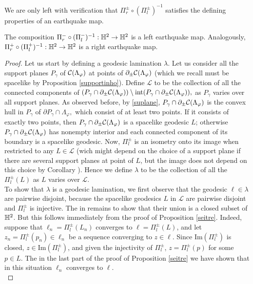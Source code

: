We are only left with verification that $\Pi_r^\pm\circ(\Pi_l^\pm)^{-1}$ satisfies the defining properties of an earthquake map. 

\begin{proposition}\label{seicinque}
    The composition $\Pi_r^-\circ(\Pi_l^-)^{-1}:\mathbb{H}^2\to\mathbb{H}^{2}$ is a left earthquake map. Analogously, $\Pi_r^+\circ(\Pi_l^+)^{-1}:\mathbb{H}^2\to\mathbb{H}^2$ is a right earthquake map.
\end{proposition}
\begin{proof}
    Let us start by defining a geodesic lamination $\lambda.$ Let us consider all the support planes $P_\gamma$ of $\mathcal{C}(\Lambda_\varphi)$ at points of $\partial_\pm\mathcal{C}(\Lambda_\varphi)$ (which we recall must be spacelike by Proposition \ref{supportinho}). Define $\mathcal{L}$ to be the collection of all the connected components of $(P_\gamma\cap\partial_\pm\mathcal{C}(\Lambda_\varphi))\setminus\text{int}(P_\gamma\cap\partial_\pm\mathcal{C}(\Lambda_\varphi)),$ as $P_\gamma$ varies over all support planes. As observed before, by \ref{suplane}, $P_\gamma\cap \partial_\pm\mathcal{C}(\Lambda_\varphi)$ is the convex hull in $P_\gamma$ of $\partial P_\gamma\cap\Lambda_\varphi,$ which consist of at least two points. If it consists of exactly two points, then $P_\gamma\cap \partial_\pm\mathcal{C}(\Lambda_\varphi)$ is a spacelike geodesic $L$; otherwise $P_\gamma\cap\partial_\pm\mathcal{C}(\Lambda_\varphi)$ has nonempty interior and each connected component of its boundary is a spacelike geodesic. Now, $\Pi_l^\pm$ is an isometry onto its image when restricted to any $L\in\mathcal{L}$ (wich might depend on the choice of a support plane if there are several support planes at point of $L$, but the image does not depend on this choice by Corollary ). Hence we define $\lambda$ to be the collection of all the $\Pi_l^\pm(L)$ as $L$ varies over $\mathcal{L}$. \\
    To show that $\lambda$ is a geodesic lamination, we first observe that the geodesic $\ell\in\lambda$ are pairwise disjoint, because the spacelike geodesics $L$ in $\mathcal{L}$ are pairwise disjoint and $\Pi_l^\pm$ is injective. The in remains to show that their union is a closed subset of $\mathbb{H}^2$. But this follows immediately from the proof of Proposition \ref{seitre}. Indeed, suppose that $\ell_n=\Pi_l^\pm(L_n)$ converges to $\ell=\Pi_l^\pm(L)$, and let $z_n=\Pi_l^\pm(p_n)\in\ell_n$ be a sequence converging to $z\in\ell$. Since $\text{Im}(\Pi_l^\pm)$ is closed, $z\in\text{Im}(\Pi_l^\pm)$, and given the injectivity of $\Pi_l^\pm$, $z=\Pi_l^\pm(p)$ for some $p\in L$. The in the last part of the proof of Proposition \ref{seitre} we have shown that in this situation $\ell_n$ converges to $\ell$. \\

\end{proof}
